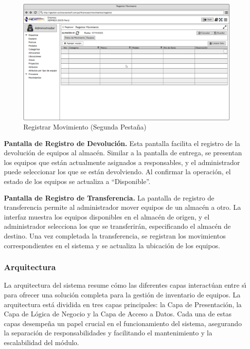\documentclass[stu, 12pt, letterpaper, donotrepeattitle, floatsintext, natbib]{apa7}
\begin{document}
\begin{figure}[H]
    \centering
    \caption{Registrar Movimiento (Segunda Pesta\~{n}a)}\label{movimiento2}
    \includegraphics[width=16.5cm, angle=0]{./images/registrarMovimiento2.png}
\end{figure}
\textbf{Pantalla de Registro de Devoluci\'on. }Esta pantalla facilita el registro de la devoluci\'on de equipos al almac\'en. Similar a la pantalla de entrega, se presentan los equipos que est\'an actualmente asignados a responsables, y el administrador puede seleccionar los que se est\'an devolviendo. Al confirmar la operaci\'on, el estado de los equipos se actualiza a ``Disponible''.

\textbf{Pantalla de Registro de Transferencia. }La pantalla de registro de transferencia permite al administrador mover equipos de un almac\'en a otro. La interfaz muestra los equipos disponibles en el almac\'en de origen, y el administrador selecciona los que se transferir\'an, especificando el almac\'en de destino. Una vez completada la transferencia, se registran los movimientos correspondientes en el sistema y se actualiza la ubicaci\'on de los equipos.
\subsubsection{Arquitectura}
La arquitectura del sistema resume c\'omo las diferentes capas interact\'uan entre s\'{\i} para ofrecer una soluci\'on completa para la gesti\'on de inventario de equipos. La arquitectura est\'a dividida en tres capas principales: la Capa de Presentaci\'on, la Capa de L\'ogica de Negocio y la Capa de Acceso a Datos. Cada una de estas capas desempe\~{n}a un papel crucial en el funcionamiento del sistema, asegurando la separaci\'on de responsabilidades y facilitando el mantenimiento y la escalabilidad del m\'odulo.
\end{document}
